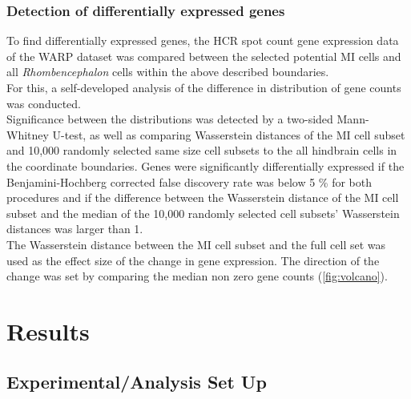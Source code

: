 \documentclass[12pt, a4paper, oneside]{article}
\begin{document}
\subsubsection{Detection of differentially expressed genes}
To find differentially expressed genes, the HCR spot count gene expression data of the WARP dataset was compared between the selected potential MI cells and all \textit{Rhombencephalon} cells within the above described boundaries.\\
For this, a self-developed analysis of the difference in distribution of gene counts was conducted.\\
Significance between the distributions was detected by a two-sided Mann-Whitney U-test, as well as comparing Wasserstein distances of the MI cell subset and 10,000 randomly selected same size cell subsets to the all hindbrain cells in the coordinate boundaries. Genes were significantly differentially expressed if the Benjamini-Hochberg corrected false discovery rate was below 5 \% for both procedures and if the difference between the Wasserstein distance of the MI cell subset and the median of the 10,000 randomly selected cell subsets' Wasserstein distances was larger than 1.\\
The Wasserstein distance between the MI cell subset and the full cell set was used as the effect size of the change in gene expression. The direction of the change was set by comparing the median non zero gene counts (\autoref{fig:volcano}).\\

\clearpage
\section{Results}

\subsection{Experimental/Analysis Set Up}
\end{document}
